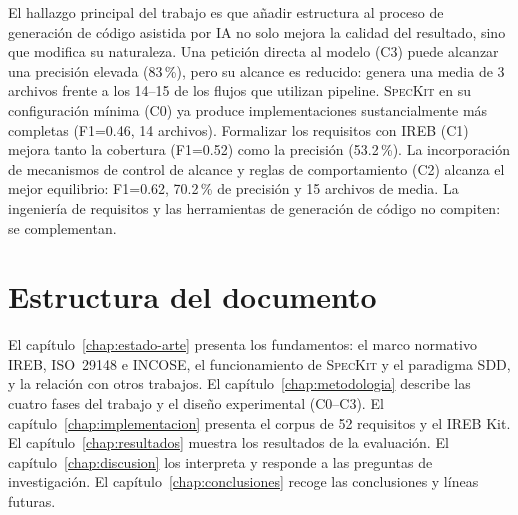 El hallazgo principal del trabajo es que a\~nadir estructura al proceso de generaci\'on de c\'odigo asistida por IA no solo mejora la calidad del resultado, sino que modifica su naturaleza. Una petici\'on directa al modelo (C3) puede alcanzar una precisi\'on elevada (83\,\%), pero su alcance es reducido: genera una media de 3 archivos frente a los 14--15 de los flujos que utilizan pipeline. \textsc{SpecKit} en su configuraci\'on m\'inima (C0) ya produce implementaciones sustancialmente m\'as completas (F1=0.46, 14 archivos). Formalizar los requisitos con IREB (C1) mejora tanto la cobertura (F1=0.52) como la precisi\'on (53.2\,\%). La incorporaci\'on de mecanismos de control de alcance y reglas de comportamiento (C2) alcanza el mejor equilibrio: F1=0.62, 70.2\,\% de precisi\'on y 15 archivos de media. La ingenier\'ia de requisitos y las herramientas de generaci\'on de c\'odigo no compiten: se complementan.

\section{Estructura del documento}

El cap\'itulo~\ref{chap:estado-arte} presenta los fundamentos: el marco normativo IREB, ISO~29148 e INCOSE, el funcionamiento de \textsc{SpecKit} y el paradigma SDD, y la relaci\'on con otros trabajos. El cap\'itulo~\ref{chap:metodologia} describe las cuatro fases del trabajo y el dise\~no experimental (C0--C3). El cap\'itulo~\ref{chap:implementacion} presenta el corpus de 52 requisitos y el IREB Kit. El cap\'itulo~\ref{chap:resultados} muestra los resultados de la evaluaci\'on. El cap\'itulo~\ref{chap:discusion} los interpreta y responde a las preguntas de investigaci\'on. El cap\'itulo~\ref{chap:conclusiones} recoge las conclusiones y l\'ineas futuras.